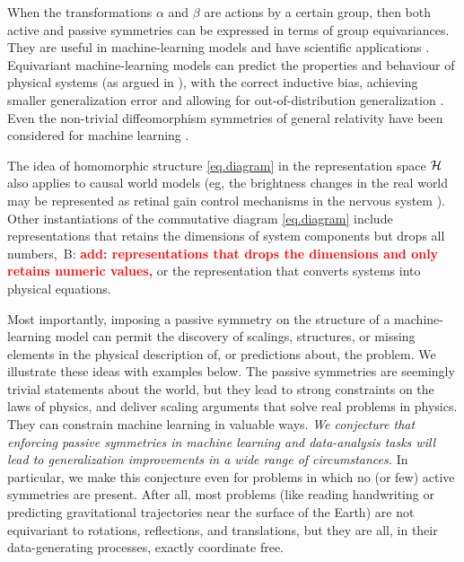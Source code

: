 \documentclass{article}
\newcommand{\bernhard}[1]{~B: \textcolor{red}{\textbf{#1}}}
\begin{document}
When the transformations $\alpha$ and $\beta$ are actions by a certain group, then both active and passive symmetries can be expressed in terms of group equivariances.
They are useful in machine-learning models \cite{cohen2016group, kondor2018convolution, thomas2018tensor, geiger2022e3nn, finzi2020generalizing, finzi2021practical} and have scientific applications \cite{batzner20223, musaelian2022learning, stark2022equibind, yu-physics, wang2022approximately}.
Equivariant machine-learning models can predict the properties and behaviour of physical systems (as argued in \cite{cheng2019covariance}), with the correct inductive bias, achieving smaller generalization error \cite{bietti2021sample, elesedy2021provably, elesedy2021kernel, mei2021learning} and allowing for out-of-distribution generalization \cite{villar2022dimensionless}. 
Even the non-trivial diffeomorphism symmetries of general relativity have been considered for machine learning \cite{weiler}.

The idea of homomorphic structure \eqref{eq.diagram} in the representation space $\cal H$ also applies to causal world models (eg, the brightness changes in the real world may be represented as retinal gain control mechanisms in the nervous system \cite{1911.10500}).
Other instantiations of the commutative diagram \eqref{eq.diagram} include representations that retains the dimensions of system components but drops all numbers,\bernhard{add: representations that drops the dimensions and only retains numeric values,} or the representation that converts systems into physical equations.

Most importantly, imposing a passive symmetry on the structure of a machine-learning model can permit the discovery of scalings, structures, or missing elements in the physical description of, or predictions about, the problem.
We illustrate these ideas with examples below.
The passive symmetries are seemingly trivial statements about the world, but they lead to strong constraints on the laws of physics, and deliver scaling arguments that solve real problems in physics.
They can constrain machine learning in valuable ways.
\emph{We conjecture that enforcing passive symmetries in machine learning and data-analysis tasks will lead to generalization improvements in a wide range of circumstances.}
In particular, we make this conjecture even for problems in which no (or few) active symmetries are present.
After all, most problems (like reading handwriting or predicting gravitational trajectories near the surface of the Earth) are not equivariant to rotations, reflections, and translations, but they are all, in their data-generating processes, exactly coordinate free.
\end{document}
